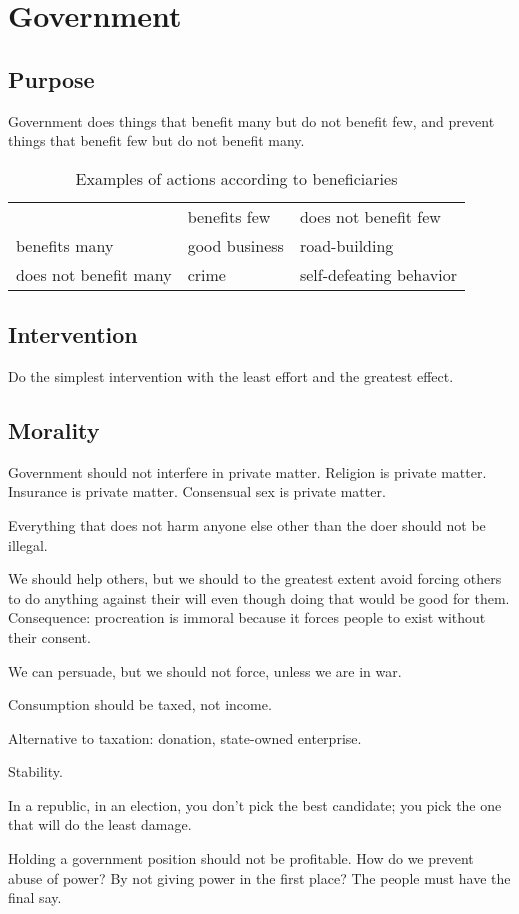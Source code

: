 \chapter{Government}

\section{Purpose}

Government does things that benefit many but do not benefit few,
and prevent things that benefit few but do not benefit many.

\begin{table}[h]
    \caption{Examples of actions according to beneficiaries}
    \begin{tabular}{lll}
        & benefits few & does not benefit few
        \\
        benefits many & good business & road-building
        \\
        does not benefit many & crime & self-defeating behavior
    \end{tabular}
\end{table}

\section{Intervention}

Do the simplest intervention with the least effort and the greatest effect.

\section{Morality}

Government should not interfere in private matter.
Religion is private matter.
Insurance is private matter.
Consensual sex is private matter.

Everything that does not harm anyone else other than the doer should not be illegal.

We should help others,
but we should to the greatest extent avoid forcing
others to do anything against their will
even though doing that would be good for them.
Consequence: procreation is immoral because
it forces people to exist without their consent.

We can persuade, but we should not force, unless we are in war.

Consumption should be taxed, not income.

Alternative to taxation: donation, state-owned enterprise.

Stability.

In a republic, in an election, you don't pick the best candidate;
you pick the one that will do the least damage.

Holding a government position should not be profitable.
How do we prevent abuse of power?
By not giving power in the first place?
The people must have the final say.
